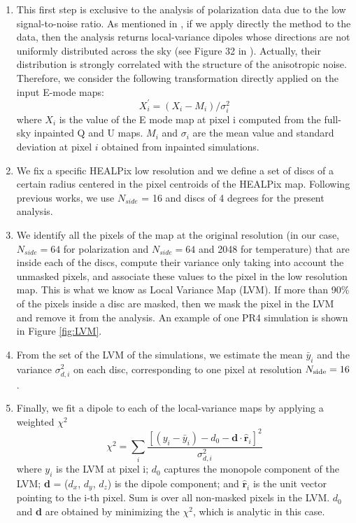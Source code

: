 %
\begin{enumerate}
    \item This first step is exclusive to the analysis of polarization data due to the low signal-to-noise ratio. As mentioned in \cite{Planck:2019evm}, if we apply directly the method to the data, then the analysis returns local-variance dipoles whose directions are not uniformly distributed across the sky (see Figure 32 in \cite{Planck:2019evm}). Actually, their distribution is strongly correlated with the structure of the anisotropic noise. Therefore, we consider the following transformation directly applied on the input E-mode maps:
    \begin{equation}
        \label{eq:Bias}
        X^{'}_{i} = (X_{i}-M_{i})/\sigma_{i}^{2} 
    \end{equation}
    where $X_{i}$ is the value of the E mode map at pixel i computed from the full-sky inpainted Q and U maps. $M_{i}$ and $\sigma_{i}$ are the mean value and standard deviation at pixel $i$ obtained from inpainted simulations.

    \item We fix a specific HEALPix low resolution and we define a set of discs of a certain radius centered in the pixel centroids of the HEALPix map. Following previous works, we use $N_{side}$ = 16 and discs of 4 degrees for the present analysis. 
    
    \item We identify all the pixels of the map at the original resolution (in our case, $N_{side} = 64$ for polarization and $N_{side} = 64$ and 2048 for temperature)  that are inside each of the discs, compute their variance only taking into account the unmasked pixels, and associate these values to the pixel in the low resolution map. This is what we know as Local Variance Map (LVM). If more than 90\% of the pixels inside a disc are masked, then we mask the pixel in the LVM and remove it from the analysis. An example of one PR4 simulation is shown in Figure \ref{fig:LVM}.

    \item From the set of the LVM of the simulations, we estimate the mean $\bar{y}_i$ and the variance $\sigma_{d, i}^{2}$ on each disc, corresponding to one pixel at resolution $N_{\rm side}=16$. 

    \item Finally, we fit a dipole to each of the local-variance maps by applying a weighted $\chi^{2}$ 
    \begin{equation}
        \label{chi}
        \chi^{2}=\sum_{i}\frac{[(y_{i}-\bar{y}_{i})-d_{0}-\textbf{d}\cdot \hat{\textbf{r}}_{i}]^{2}}{\sigma_{d, i}^{2}}
    \end{equation}
    where $y_{i}$ is the LVM at pixel i; 
    $d_{0}$ captures the monopole component of the LVM; \textbf{d} = ($d_{x}$, $d_{y}$, $d_{z}$) is the dipole component; and $\hat{\textbf{r}}_{i}$ is the unit vector pointing to the i-th pixel. Sum is over all non-masked pixels in the LVM. $d_{0}$ and \textbf{d} are obtained by minimizing the $\chi^{2}$, which is analytic in this case.
\end{enumerate}

